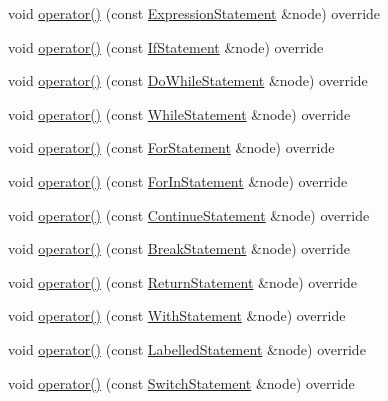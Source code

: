 \begin{DoxyCompactItemize}
\item 
void \hyperlink{struct_callable_visitor_ae09660080883ac12939e8b9581113e9c}{operator()} (const \hyperlink{structast_1_1_expression_statement}{Expression\+Statement} \&node) override
\item 
void \hyperlink{struct_callable_visitor_a5aaa91de3ead2c42bed03df3fa0de990}{operator()} (const \hyperlink{structast_1_1_if_statement}{If\+Statement} \&node) override
\item 
void \hyperlink{struct_callable_visitor_a02bd47f3f8baf9ba24530d4622dc137d}{operator()} (const \hyperlink{structast_1_1_do_while_statement}{Do\+While\+Statement} \&node) override
\item 
void \hyperlink{struct_callable_visitor_adffa6fa6621caae9474604fafb91fdfd}{operator()} (const \hyperlink{structast_1_1_while_statement}{While\+Statement} \&node) override
\item 
void \hyperlink{struct_callable_visitor_a78b5cf2f0db8eb174097f4fcc8618b75}{operator()} (const \hyperlink{structast_1_1_for_statement}{For\+Statement} \&node) override
\item 
void \hyperlink{struct_callable_visitor_a45b8579f057d5566ad016f667cf2c068}{operator()} (const \hyperlink{structast_1_1_for_in_statement}{For\+In\+Statement} \&node) override
\item 
void \hyperlink{struct_callable_visitor_a15e41131b34e8d1a54b3af9719287248}{operator()} (const \hyperlink{structast_1_1_continue_statement}{Continue\+Statement} \&node) override
\item 
void \hyperlink{struct_callable_visitor_a3281651a229ad1e156aba9216bb64cec}{operator()} (const \hyperlink{structast_1_1_break_statement}{Break\+Statement} \&node) override
\item 
void \hyperlink{struct_callable_visitor_aebfd735e24e1161b3414d1bd5ad31cd5}{operator()} (const \hyperlink{structast_1_1_return_statement}{Return\+Statement} \&node) override
\item 
void \hyperlink{struct_callable_visitor_a08a6aec153b2e3b25b53642a6b9c7aab}{operator()} (const \hyperlink{structast_1_1_with_statement}{With\+Statement} \&node) override
\item 
void \hyperlink{struct_callable_visitor_a75929176e0ea51e67f01ed53d53bfa18}{operator()} (const \hyperlink{structast_1_1_labelled_statement}{Labelled\+Statement} \&node) override
\item 
void \hyperlink{struct_callable_visitor_a22380f6060601822b4c2f316d32c20a5}{operator()} (const \hyperlink{structast_1_1_switch_statement}{Switch\+Statement} \&node) override

\end{DoxyCompactItemize}

